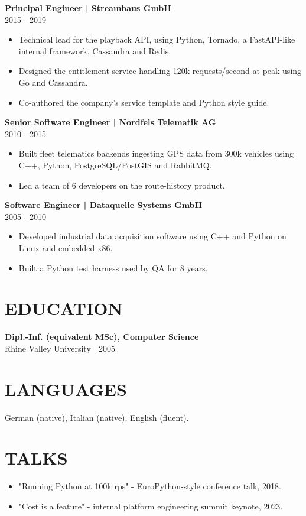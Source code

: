 \documentclass[11pt,a4paper]{article}
\newcommand{\cvsection}[1]{\section*{#1}}
\newcommand{\cvrole}[2]{\noindent\textbf{#1}\\#2\par}
\begin{document}
\cvrole{Principal Engineer | Streamhaus GmbH}{2015 - 2019}
\begin{itemize}
\item Technical lead for the playback API, using Python, Tornado, a FastAPI-like internal framework, Cassandra and Redis.
\item Designed the entitlement service handling 120k requests/second at peak using Go and Cassandra.
\item Co-authored the company's service template and Python style guide.
\end{itemize}

\cvrole{Senior Software Engineer | Nordfels Telematik AG}{2010 - 2015}
\begin{itemize}
\item Built fleet telematics backends ingesting GPS data from 300k vehicles using C++, Python, PostgreSQL/PostGIS and RabbitMQ.
\item Led a team of 6 developers on the route-history product.
\end{itemize}

\cvrole{Software Engineer | Dataquelle Systems GmbH}{2005 - 2010}
\begin{itemize}
\item Developed industrial data acquisition software using C++ and Python on Linux and embedded x86.
\item Built a Python test harness used by QA for 8 years.
\end{itemize}

\cvsection{EDUCATION}
\textbf{Dipl.-Inf. (equivalent MSc), Computer Science}\\
Rhine Valley University | 2005

\cvsection{LANGUAGES}
German (native), Italian (native), English (fluent).

\cvsection{TALKS}
\begin{itemize}
\item "Running Python at 100k rps" - EuroPython-style conference talk, 2018.
\item "Cost is a feature" - internal platform engineering summit keynote, 2023.
\end{itemize}
\end{document}
